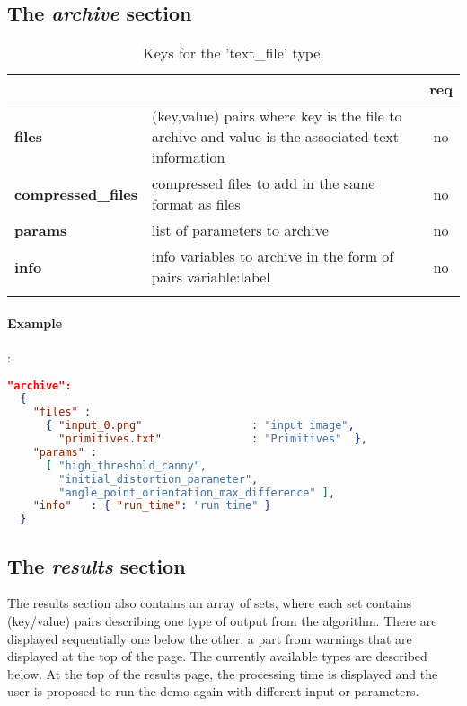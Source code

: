 \subsection{The \emph{archive} section}


\begin{longtable}{|>{\bf}L{\linewidth}|L{\linewidth}|c|}
\hline
{}     &  & {\bf req} \tabularnewline 
\hline \hline
 files    & (key,value) pairs where key is the file to archive and value is 
            the associated text information & no \\ \hline
 compressed\_\-files   & compressed files to add in the same format 
as files & no \\ \hline
 params  & list of parameters to archive & no \\ \hline
 info    & info variables to archive in the form of pairs variable:label & no \\ \hline
\caption{Keys for the 'text\_file' type.}
\end{longtable}


\paragraph{Example}:\\
\begin{lstlisting}[language=json,firstnumber=1]
"archive":
  {
    "files" : 
      { "input_0.png"                 : "input image",
        "primitives.txt"              : "Primitives"  },
    "params" :  
      [ "high_threshold_canny", 
        "initial_distortion_parameter", 
        "angle_point_orientation_max_difference" ],
    "info"   : { "run_time": "run time" }
  }
\end{lstlisting}

\subsection{The \emph{results} section}


The results section also contains an array of sets, where each set contains 
(key/value) pairs describing one type of output from the algorithm. There are 
displayed sequentially one below the other, a part from warnings that are 
displayed at the top of the page. The currently available types are described 
below. At the top of the results page, the processing time is displayed and the 
user is proposed to run the demo again with different input or parameters.


